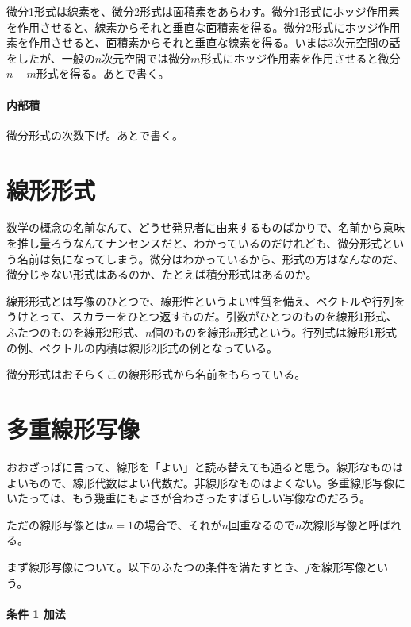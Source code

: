 微分1形式は線素を、微分2形式は面積素をあらわす。微分1形式にホッジ作用素を作用させると、線素からそれと垂直な面積素を得る。微分2形式にホッジ作用素を作用させると、面積素からそれと垂直な線素を得る。いまは3次元空間の話をしたが、一般の$n$次元空間では微分$m$形式にホッジ作用素を作用させると微分$n-m$形式を得る。あとで書く。

\paragraph{内部積}

微分形式の次数下げ。あとで書く。


\section{線形形式}

数学の概念の名前なんて、どうせ発見者に由来するものばかりで、名前から意味を推し量ろうなんてナンセンスだと、わかっているのだけれども、微分形式という名前は気になってしまう。微分はわかっているから、形式の方はなんなのだ、微分じゃない形式はあるのか、たとえば積分形式はあるのか。

線形形式とは写像のひとつで、線形性というよい性質を備え、ベクトルや行列をうけとって、スカラーをひとつ返すものだ。引数がひとつのものを線形1形式、ふたつのものを線形2形式、$n$個のものを線形$n$形式という。行列式は線形1形式の例、ベクトルの内積は線形2形式の例となっている。

微分形式はおそらくこの線形形式から名前をもらっている。

\newpage


\section{多重線形写像}

おおざっぱに言って、線形を「よい」と読み替えても通ると思う。線形なものはよいもので、線形代数はよい代数だ。非線形なものはよくない。多重線形写像にいたっては、もう幾重にもよさが合わさったすばらしい写像なのだろう。

ただの線形写像とは$n=1$の場合で、それが$n$回重なるので$n$次線形写像と呼ばれる。

\hrulefill

まず線形写像について。以下のふたつの条件を満たすとき、$ f $を線形写像という。

\paragraph{条件 1 加法}

